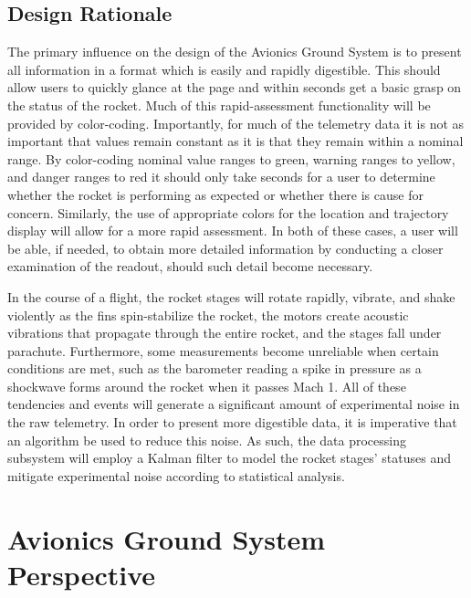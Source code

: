 \documentclass[journal,10pt,onecolumn,compsoc]{IEEEtran}
\begin{document}
	\subsection{Design Rationale}
		\noindent The primary influence on the design of the Avionics Ground System is to present all information in a format which is easily and rapidly digestible.
		This should allow users to quickly glance at the page and within seconds get a basic grasp on the status of the rocket.
		Much of this rapid-assessment functionality will be provided by color-coding.
		Importantly, for much of the telemetry data it is not as important that values remain constant as it is that they remain within a nominal range. 
		By color-coding nominal value ranges to green, warning ranges to yellow, and danger ranges to red it should only take seconds for a user to determine whether the rocket is performing as expected or whether there is cause for concern.
		Similarly, the use of appropriate colors for the location and trajectory display will allow for a more rapid assessment.
		In both of these cases, a user will be able, if needed, to obtain more detailed information by conducting a closer examination of the readout, should such detail become necessary.

		\noindent In the course of a flight, the rocket stages will rotate rapidly, vibrate, and shake violently as the fins  spin-stabilize the rocket, the motors create acoustic vibrations that propagate through the entire rocket, and the stages fall under parachute.
		Furthermore, some measurements become unreliable when certain conditions are met, such as the barometer reading a spike in pressure as a shockwave forms around the rocket when it passes Mach 1.
		All of these tendencies and events will generate a significant amount of experimental noise in the raw telemetry.
		In order to present more digestible data, it is imperative that an algorithm be used to reduce this noise.
		As such, the data processing subsystem will employ a Kalman filter to model the rocket stages' statuses and mitigate experimental noise according to statistical analysis.
		
\newpage


\section{Avionics Ground System Perspective}
\end{document}
